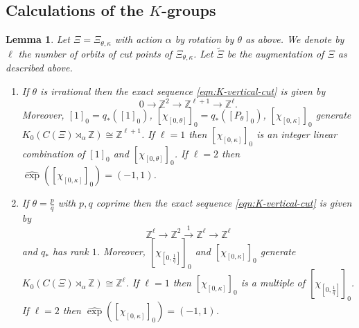 \documentclass[11pt]{amsart}
\newtheorem{lemma}{Lemma}[section]
\newcommand{\Z}{\mathbb{Z}}
\newcommand{\cut}{\kappa}
\newcommand{\p}{p}
\newcommand{\q}{q}
\begin{document}
\subsection{Calculations of the $K$-groups}
\begin{lemma}\label{lem-K-irrational}
	Let $\Xi=\Xi_{\theta,\cut}$ with action $\alpha$ by rotation by $\theta$ as above. We denote by $\ell$ the number of orbits of cut points of $\Xi_{\theta,\cut}$.
	Let $\tilde\Xi$ be the augmentation of $\Xi$ as described above. 
\begin{enumerate}
\item If $\theta$ is irrational then
the exact sequence \eqref{eqn:K-vertical-cut} is given by 
\begin{equation}\label{eq-KES2cuti}\nonumber
0\xrightarrow{}  \Z^2 \xrightarrow{} \Z^{\ell+1}
	\xrightarrow{} \Z^{\ell}  .
\end{equation}
Moreover,  $[1]_0=q_*([1]_0)$, $[\chi_{[0,\theta]}]_0=q_*([P_\theta]_0)$, $[\chi_{[0,\cut]}]_0$ generate $K_0(C(\Xi)\rtimes_\alpha\Z)\cong\Z^{\ell+1}$. If $\ell=1$ then $[\chi_{[0,\cut]}]_0$ is an integer linear combination of $[1]_0$ and $[\chi_{[0,\theta]}]_0$. If $\ell=2$ then $\hat\exp([\chi_{[0,\cut]}]_0) = (-1,1)$.
\item If $\theta=\frac{\p}{\q}$ with $\p,\q$ coprime then the exact sequence \eqref{eqn:K-vertical-cut} is given by 
\begin{equation}\label{eq-KES2cutq}\nonumber
\Z^\ell \xrightarrow{}  \Z^2 \xrightarrow{1} \Z^{\ell}
	\xrightarrow{} \Z^{\ell}  
\end{equation}
 and $q_*$ has rank $1$.
Moreover, 
$[\chi_{[0,\frac1{\q}]}]_0$ and $[\chi_{[0,\cut]}]_0$ generate $K_0(C(\Xi)\rtimes_\alpha\Z)\cong\Z^{\ell}$. If $\ell=1$ then $[\chi_{[0,\cut]}]_0$ is a multiple of $[\chi_{[0,\frac1{\q}]}]_0$. If $\ell=2$ then $\hat\exp([\chi_{[0,\cut]}]_0) = (-1,1)$.
\end{enumerate}
\end{lemma}
\end{document}
